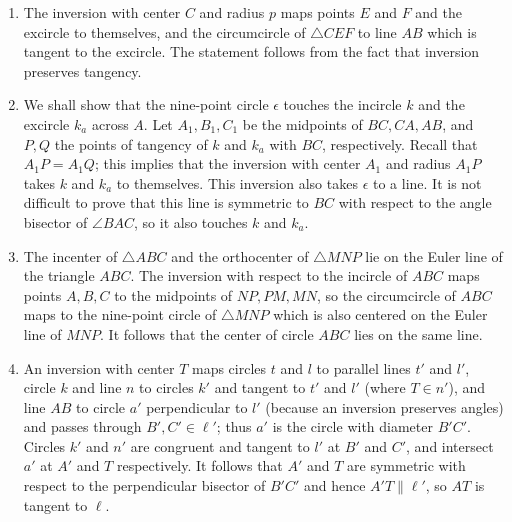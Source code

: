 \documentclass[11pt,a4paper]{article}
\begin{document}
\begin{enumerate}
\item The inversion with center $C$ and radius $p$ maps points $E$ and $F$ and the excircle to themselves, and the circumcircle of $\triangle CEF$ to line $AB$ which is tangent to the excircle. The statement follows from the fact that inversion preserves tangency. 

\item We shall show that the nine-point circle $\epsilon$ touches the incircle $k$ and the excircle $k_a$ across $A$. Let $A_1,B_1,C_1$ be the midpoints of $BC,CA,AB$, and $P,Q$ the points of tangency of $k$ and $k_a$ with $BC$, respectively. Recall that $A_1P=A_1Q$; this implies that the inversion with center $A_1$ and radius $A_1P$ takes $k$ and $k_a$ to themselves. This inversion also takes $\epsilon$ to a line. It is not difficult to prove that this line is symmetric to $BC$ with respect to the angle bisector of $\angle BAC$, so it also touches $k$ and $k_a$. 

\item The incenter of $\triangle ABC$ and the orthocenter of $\triangle MNP$ lie on the Euler line of the triangle $ABC$. The inversion with respect to the incircle of $ABC$ maps points $A,B,C$ to the midpoints of $NP,PM,MN$, so the circumcircle of $ABC$ maps to the nine-point circle of $\triangle MNP$ which is also centered on the Euler line of $MNP$. It follows that the center of circle $ABC$ lies on the same line. 

\item An inversion with center $T$ maps circles $t$ and $l$ to parallel lines $t'$ and $l'$, circle $k$ and line $n$ to circles $k'$ and   tangent to $t'$ and $l'$ (where $T\in n'$), and line $AB$ to circle $a'$ perpendicular to $l'$ (because an inversion preserves angles) and passes through $B',C'\in \ell'$; thus $a'$ is the circle with diameter $B'C'$. Circles $k'$ and $n'$ are congruent and tangent to $l'$ at $B'$ and $C'$, and intersect $a'$ at $A'$ and $T$ respectively. It follows that $A'$ and $T$ are symmetric with respect to the perpendicular bisector of $B'C'$ and hence $A'T\parallel \ell'$, so $AT$ is tangent to $\ell$. 


\end{enumerate}
\end{document}
